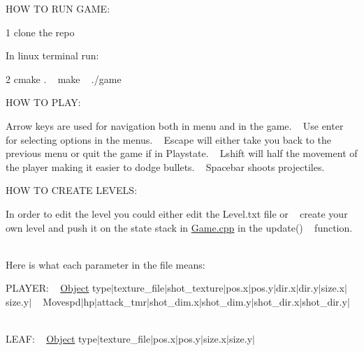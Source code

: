 HOW TO RUN GAME\+:

1 clone the repo ~\newline


In linux terminal run\+: ~\newline


2 cmake . ~ make ~ ./game ~\newline


HOW TO PLAY\+: ~\newline


Arrow keys are used for navigation both in menu and in the game. ~\newline
 Use enter for selecting options in the menus. ~\newline
 Escape will either take you back to the previous menu or quit the game if in Playstate. ~\newline
 Lshift will half the movement of the player making it easier to dodge bullets. ~\newline
 Spacebar shoots projectiles. ~\newline


HOW TO CREATE LEVELS\+: ~\newline


In order to edit the level you could either edit the Level.\+txt file or ~\newline
 create your own level and push it on the state stack in \mbox{\hyperlink{Game_8cpp_source}{Game.\+cpp}} in the update() ~\newline
 function. ~\newline


Here is what each parameter in the file means\+: ~\newline


PLAYER\+: ~\newline
 \mbox{\hyperlink{classObject}{Object}} type$\vert$texture\+\_\+file$\vert$shot\+\_\+texture$\vert$pos.x$\vert$pos.y$\vert$dir.x$\vert$dir.y$\vert$size.x$\vert$size.y$\vert$ ~\newline
 Movespd$\vert$hp$\vert$attack\+\_\+tmr$\vert$shot\+\_\+dim.x$\vert$shot\+\_\+dim.y$\vert$shot\+\_\+dir.x$\vert$shot\+\_\+dir.y$\vert$ ~\newline


LEAF\+: ~\newline
 \mbox{\hyperlink{classObject}{Object}} type$\vert$texture\+\_\+file$\vert$pos.x$\vert$pos.y$\vert$size.x$\vert$size.y$\vert$ ~\newline


